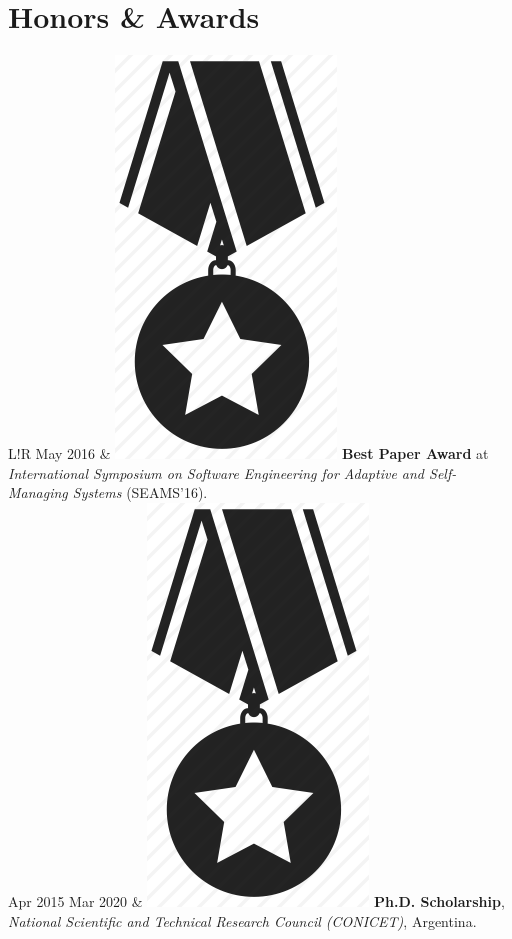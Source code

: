 \documentclass[10pt]{article}
\newcommand\VRule{\color{lightgray}\vrule width 0.5pt}
\begin{document}
\section*{Honors \& Awards}

\begin{tabular}{L!{\VRule}R}
May 2016 & \includegraphics[scale=0.022]{../img/medal.png}
\textbf{Best Paper Award} at \textit{International Symposium on 
Software Engineering for Adaptive and Self-Managing Systems} (SEAMS'16).\\

Apr 2015 Mar 2020 & \includegraphics[scale=0.022]{../img/medal.png} 
\hspace{-0.85mm} 
\textbf{Ph.D. 
Scholarship}, \textit{National Scientific and Technical
Research Council (CONICET)}, Argentina.\\


\end{tabular}
\end{document}
